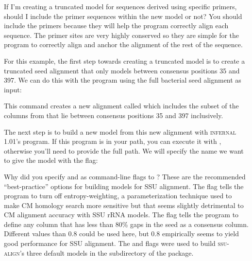 \begin{srefaq}{If I'm creating a truncated model for sequences derived
    using specific primers, should I include the primer sequences
    within the new model or not?} You should include the primers
  because they will help the program correctly align each
  sequence. The primer sites are very highly conserved so they are
  simple for the program to correctly align and anchor the alignment
  of the rest of the sequence.
\end{srefaq}

For this example, the first step towards creating a truncated model is
to create a truncated seed alignment that only models between
consensus positions 35 and 397. We can do this with the
 program using the full bacterial seed alignment as
input:


This command creates a new alignment called  which
includes the subset of the columns from  that lie
between consensus positions 35 and 397 inclusively.

The next step is to build a new model from this new alignment with
\textsc{infernal} 1.01's  program. If this program is in
your path, you can execute it with , otherwise you'll
need to provide the full path. We will specify the name we want
to give the model with the  flag:


\begin{srefaq}{Why did you specify  and
     as command-line flags to ?}
    These are the recommended ``best-practice'' options for building
    models for SSU alignment. The  flag tells the
    program to turn off entropy-weighting, a parameterization
    technique used to make CM homology search more sensitive
    \cite{NawrockiEddy07} but that seems slightly detrimental to CM
    alignment accuracy with SSU rRNA models. The  flag tells the program to define any column that has less
    than 80\% gaps in the seed as a consensus column. Different values
    than 0.8 could be used here, but 0.8 empirically seems to yield
    good performance for SSU alignment. The  and
     flags were used to build
    \textsc{ssu-align}'s three default models in the 
    subdirectory of the package.
\end{srefaq}


